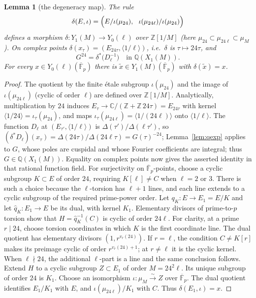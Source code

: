 \documentclass[11pt,a4paper]{article}
\numberwithin{equation}{section}
\newtheorem{lemma}[theorem]{Lemma}
\theoremstyle{definition}
\theoremstyle{remark}
\newcommand{\Fb}{\overline{\mathbb F}_p}
\newcommand{\Z}{\mathbb Z}
\newcommand{\Q}{\mathbb Q}
\begin{document}
\begin{lemma}[the degeneracy map]\label{lem:delta}
The rule
\[
\delta(E,\iota)=\Bigl(E/\iota(\mu_{24}),\ \ \iota(\mu_{24\ell})/\iota(\mu_{24})\Bigr)
\]
defines a morphism $\delta:Y_1(M)\to Y_0(\ell)$ over $\Z[1/M]$ (here $\mu_{24}\subset\mu_{24\ell}\subset\mu_M$).
On complex points $\delta(x_\tau)=(E_{24\tau},\langle 1/\ell\rangle)$, i.e.\ $\delta$ is
$\tau\mapsto24\tau$, and
\[
G^{24}=\delta^*\bigl(D_\ell^{-1}\bigr)\quad\text{in }\Q(X_1(M)).
\]
For every $x\in Y_0(\ell)(\Fb)$ there is $\tilde x\in Y_1(M)(\Fb)$ with $\delta(\tilde x)=x$.
\end{lemma}
\begin{proof}
The quotient by the finite \'etale subgroup $\iota(\mu_{24})$ and the image of $\iota(\mu_{24\ell})$
(cyclic of order $\ell$) are defined over $\Z[1/M]$. Analytically, multiplication by $24$ induces
$E_\tau\to\mathbb C/(\Z+\Z\,24\tau)=E_{24\tau}$ with kernel $\langle 1/24\rangle=\iota_\tau(\mu_{24})$,
and maps $\iota_\tau(\mu_{24\ell})=\langle1/(24\ell)\rangle$ onto $\langle1/\ell\rangle$. The
function $D_\ell$ at $(E_{\tau'},\langle1/\ell\rangle)$ is $\Delta(\tau')/\Delta(\ell\tau')$, so
$(\delta^*D_\ell)(x_\tau)=\Delta(24\tau)/\Delta(24\ell\tau)=G(\tau)^{-24}$; Lemma~\ref{lem:qexp} applies to $G$, whose poles are cuspidal and whose Fourier
coefficients are integral; thus $G\in\Q(X_1(M))$. Equality on complex points now
gives the asserted identity in that rational function field. For surjectivity on $\Fb$-points, choose a cyclic subgroup $K\subset E$ of
order $24$, requiring $K[\ell]\ne C$ when $\ell=2$ or $3$.
There is such a choice because the $\ell$-torsion has $\ell+1$ lines, and each line
extends to a cyclic subgroup of the required prime-power order.
Let $q_K:E\to E_1=E/K$ and let $\widehat q_K:E_1\to E$ be its dual, with
kernel $K_1$. Elementary divisors of prime-to-$p$ torsion show that
$H=\widehat q_K^{-1}(C)$ is cyclic of order $24\ell$.
For clarity, at a prime $r\mid24$, choose torsion coordinates in which $K$
is the first coordinate line. The dual quotient has elementary divisors
$(1,r^{v_r(24)})$. If $r=\ell$, the condition $C\ne K[r]$ makes its preimage
cyclic of order $r^{v_r(24)+1}$; at $r\ne\ell$ it is the cyclic kernel.
When $\ell\nmid24$, the additional $\ell$-part is a line and the same conclusion follows.
Extend $H$ to a cyclic subgroup $Z\subset E_1$ of order $M=24^2\ell$.
Its unique subgroup of order $24$ is $K_1$. Choose an isomorphism
$\iota:\mu_M\xrightarrow{\sim} Z$ over $\Fb$.
The dual quotient identifies $E_1/K_1$ with $E$, and
$\iota(\mu_{24\ell})/K_1$ with $C$. Thus $\delta(E_1,\iota)=x$.
\end{proof}
\end{document}
